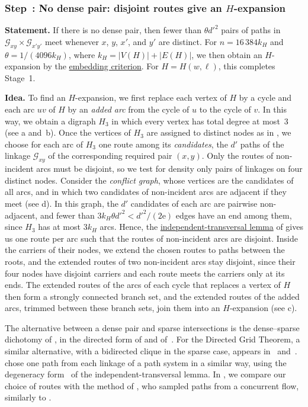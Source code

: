 \documentclass[fontsize=12pt,leading=14pt]{fullpaper}
\newcommand{\Gcal}{\mathcal{G}}
\newcommand{\Hwl}{H(w,\ell)}
\newcounter{step}
\renewcommand{\thestep}{\arabic{step}}
\newcommand{\step}[2]{%
\subsubsection*{\refstepcounter{step}\label{step:#1}Step~\thestep: #2}}
\newcommand{\stmt}[1]{\par\noindent\textbf{Statement.} #1\par\smallskip}
\newcommand{\idea}[1]{\noindent\textbf{Idea.} #1\par}
\begin{document}
\step{sparse}{No dense pair: disjoint routes give an $H$-expansion}
\stmt{If there is no dense pair, then fewer than $\theta d'^2$ pairs of paths in $\Gcal_{xy}\times\Gcal_{x'y'}$ meet whenever $x$, $y$, $x'$, and $y'$ are distinct.
  For $n=16\,384k_H$ and $\theta=1/(4096k_H)$, where $k_H=|V(H)|+|E(H)|$, we then obtain an $H$-expansion by the \hyperref[cor:weight]{embedding criterion}.
For $H=\Hwl$, this completes Stage~1.}
\idea{To find an $H$-expansion, we first replace each vertex of $H$ by a cycle and each arc $uv$ of $H$ by an \emph{added arc} from the cycle of $u$ to the cycle of $v$.
  In this way, we obtain a digraph $H_3$ in which every vertex has total degree at most~$3$ (see \zcref{fig:ov-lll}a and~b).
  Once the vertices of $H_3$ are assigned to distinct nodes as in \zcref{step:prep-nodes}, we choose for each arc of $H_3$ one route among its \emph{candidates}, the $d'$ paths of the linkage $\Gcal_{xy}$ of the corresponding required pair $(x,y)$.
  Only the routes of non-incident arcs must be disjoint, so we test for density only pairs of linkages on four distinct nodes.
  Consider the \emph{conflict graph}, whose vertices are the candidates of all arcs, and in which two candidates of non-incident arcs are adjacent if they meet (see \zcref{fig:ov-lll}d).
  In this graph, the $d'$ candidates of each arc are pairwise non-adjacent, and fewer than $3k_H\theta d'^2<d'^2/(2\mathrm e)$ edges have an end among them, since $H_3$ has at most $3k_H$ arcs.
  Hence, the \hyperref[prop:indep-transversal]{independent-transversal lemma} of \textcite[Lemma~4.2]{RW12} gives us one route per arc such that the routes of non-incident arcs are disjoint.
  Inside the carriers of their nodes, we extend the chosen routes to paths between the roots, and the extended routes of two non-incident arcs stay disjoint, since their four nodes have disjoint carriers and each route meets the carriers only at its ends.
  The extended routes of the arcs of each cycle that replaces a vertex of $H$ then form a strongly connected branch set, and the extended routes of the added arcs, trimmed between these branch sets, join them into an $H$-expansion (see \zcref{fig:ov-lll}c).

  The alternative between a dense pair and sparse intersections is the dense--sparse dichotomy of \textcite[proof of Theorem~1.2]{RW12}, in the directed form of \textcite[lemmas~3.1 and~3.3]{MPRS22} and of~\cite[Lemma~5.3]{CLNS26}.
  For the Directed Grid Theorem, a similar alternative, with a bidirected clique in the sparse case, appears in~\cite[Lemma~4.8 and Theorem~4.2]{KawarabayashiK15} and~\cite[Lemma~5.13 and Theorem~5.14]{HKMM26a}.
  \textcite[proof of Lemma~3.3]{MPRS22} chose one path from each linkage of a path system in a similar way, using the degeneracy form~\cite[Lemma~4.3]{RW12} of the independent-transversal lemma.
In \zcref{sec:embed}, we compare our choice of routes with the method of \textcite[Section~4]{HKPS22}, who sampled paths from a concurrent flow, similarly to \textcite{GroheM09}.}
\end{document}
